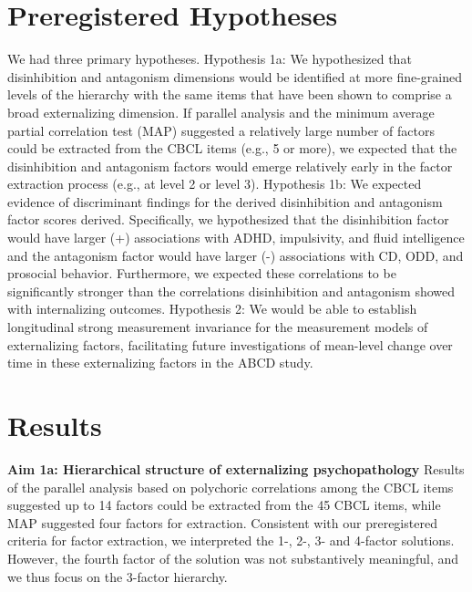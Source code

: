 \documentclass[
  20pt,
  number,
  preprint,
  3p,
  twocolumn]{elsarticle}
\begin{document}
\hypertarget{preregistered-hypotheses}{%
\section{Preregistered Hypotheses}\label{preregistered-hypotheses}}

We had three primary hypotheses. Hypothesis 1a: We hypothesized that
disinhibition and antagonism dimensions would be identified at more
fine-grained levels of the hierarchy with the same items that have been
shown to comprise a broad externalizing dimension. If parallel analysis
and the minimum average partial correlation test (MAP) suggested a
relatively large number of factors could be extracted from the CBCL
items (e.g., 5 or more), we expected that the disinhibition and
antagonism factors would emerge relatively early in the factor
extraction process (e.g., at level 2 or level 3). Hypothesis 1b: We
expected evidence of discriminant findings for the derived disinhibition
and antagonism factor scores derived. Specifically, we hypothesized that
the disinhibition factor would have larger (+) associations with ADHD,
impulsivity, and fluid intelligence and the antagonism factor would have
larger (-) associations with CD, ODD, and prosocial behavior.
Furthermore, we expected these correlations to be significantly stronger
than the correlations disinhibition and antagonism showed with
internalizing outcomes. Hypothesis 2: We would be able to establish
longitudinal strong measurement invariance for the measurement models of
externalizing factors, facilitating future investigations of mean-level
change over time in these externalizing factors in the ABCD study.

\hypertarget{results}{%
\section{Results}\label{results}}

\textbf{Aim 1a: Hierarchical structure of externalizing psychopathology}
Results of the parallel analysis based on polychoric correlations among
the CBCL items suggested up to 14 factors could be extracted from the 45
CBCL items, while MAP suggested four factors for extraction. Consistent
with our preregistered criteria for factor extraction, we interpreted
the 1-, 2-, 3- and 4-factor solutions. However, the fourth factor of the
solution was not substantively meaningful, and we thus focus on the
3-factor hierarchy.
\end{document}
